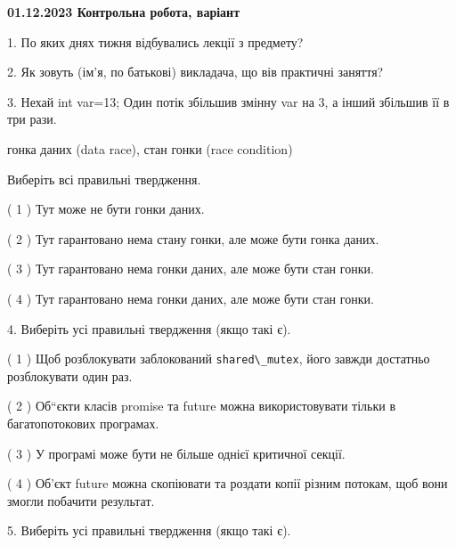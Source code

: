 \documentclass[12pt, ukrainian]{article}
\def\code#1{\Verb!#1!}
\begin{document}
\vspace{4mm}
\newpage
\begin {large}

\textbf{01.12.2023 Контрольна робота, варіант  }\par


{
1. По яких днях тижня відбувались лекції з предмету?



\vspace{5mm}
2. Як зовуть (ім'я, по батькові) викладача, що вів практичні заняття?



\vspace{5mm}
3. Нехай int var=13; Один потік збільшив змінну var на 3, а інший збільшив її в три рази.

гонка даних (data race), стан гонки (race condition)

Виберіть всі правильні твердження.\par
\vspace{2mm}
( 1 ) Тут може не бути гонки даних.%

( 2 ) Тут гарантовано нема стану гонки, але може бути гонка даних.%

( 3 ) Тут гарантовано нема гонки даних, але може бути стан гонки.%

( 4 ) Тут гарантовано нема гонки даних, але може бути стан гонки.%


\vspace{5mm}
4. Виберіть усі правильні твердження (якщо такі є).\par
\vspace{2mm}

( 1 ) Щоб розблокувати заблокований \code{shared\_mutex}, його завжди достатньо розблокувати один раз.%

( 2 ) Об“єкти класів promise та future можна використовувати тільки в багатопотокових програмах.%

( 3 ) У програмі може бути не більше однієї критичної секції.%

( 4 ) Об’єкт future можна скопіювати та роздати копії різним потокам, щоб вони змогли побачити результат.%


\vspace{5mm}
5. Виберіть усі правильні твердження (якщо такі є).\par
\vspace{2mm}

}
\end{large}
\end{document}
